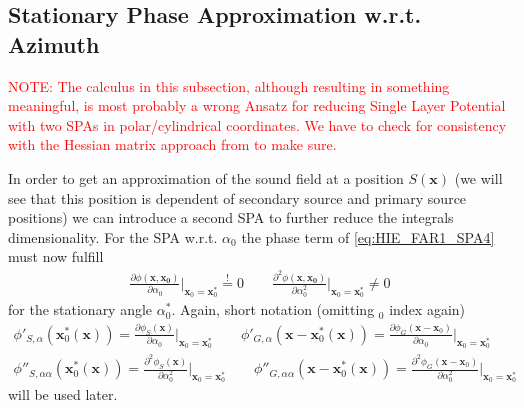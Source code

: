 \documentclass[a4paper,BCOR=15mm,10pt,twoside]{scrartcl}
\newcommand{\fscom}[2][red]{\textcolor{#1}{#2}}  %
\newcommand\azx{\alpha}  %
\renewcommand{\vec}[1]{\mathbf{#1}}  %
\begin{document}
 \subsection{Stationary Phase Approximation w.r.t. Azimuth}
\fscom{NOTE: The calculus in this subsection, although resulting in something meaningful, is most probably a wrong Ansatz for reducing Single Layer Potential with two SPAs in polar/cylindrical coordinates. We have to check for consistency with the Hessian matrix approach from \cite[App. B]{Firtha2018Diss} to make sure.}

In order to get an approximation of the sound field at a position $S(\vec{x})$ (we will see that this position is dependent of secondary source and primary source positions) we can introduce a second SPA to further reduce the integrals dimensionality.
%
For the SPA w.r.t. $\azx_0$ the phase term of \eqref{eq:HIE_FAR1_SPA4} must now fulfill
%
\begin{align}
\frac{\partial \phi(\vec{x}, \vec{x_0})}{\partial \azx_0}\bigg|_{\vec{x}_0=\vec{x}_0^*} \stackrel{!}{=} 0\qquad 
\frac{\partial^2 \phi(\vec{x}, \vec{x_0})}{\partial \azx_0^2}\bigg|_{\vec{x}_0=\vec{x}_0^*} \neq 0
\end{align}
for the stationary angle $\azx_0^*$.
%
Again, short notation (omitting $_0$ index again)
%
\begin{align}
\phi'_{S,\azx}(\vec{x}_0^*(\vec{x})) = \frac{\partial \phi_{S}(\vec{x})}{\partial \azx_0}\bigg|_{\vec{x}_0=\vec{x}_0^*}\qquad
\phi'_{G,\azx}(\vec{x}-\vec{x}_0^*(\vec{x})) = \frac{\partial \phi_{G}(\vec{x}-\vec{x}_0)}{\partial \azx_0}\bigg|_{\vec{x}_0=\vec{x}_0^*} \\
\phi''_{S,\azx\azx}(\vec{x}_0^*(\vec{x})) = \frac{\partial^2 \phi_{S}(\vec{x})}{\partial \azx_0^2}\bigg|_{\vec{x}_0=\vec{x}_0^*}\qquad
\phi''_{G,\azx\azx}(\vec{x}-\vec{x}_0^*(\vec{x})) = \frac{\partial^2 \phi_{G}(\vec{x}-\vec{x}_0)}{\partial \azx_0^2}\bigg|_{\vec{x}_0=\vec{x}_0^*}
\end{align}
%
will be used later.
%
\end{document}
